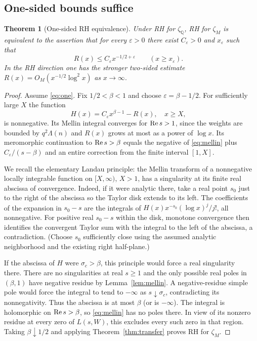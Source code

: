 \documentclass[11pt]{article}
\newtheorem{theorem}{Theorem}[section]
\theoremstyle{remark}\newtheorem{remark}[theorem]{Remark}
\newcommand{\Q}{\mathbb Q}\newcommand{\C}{\mathbb C}\newcommand{\F}{\mathbb F}\newcommand{\one}{\mathbf 1}\newcommand{\St}{\mathrm{St}}\newcommand{\Gg}{\Gamma}\newcommand{\PT}{\mathcal P}\newcommand{\eps}{\varepsilon}
\begin{document}
\subsection{One-sided bounds suffice}
\begin{theorem}[One-sided RH equivalence]\label{thm:onesided}
Under RH for $\zeta_\Q$, RH for $\zeta_M$ is equivalent to the assertion that for every $\eps>0$ there exist $C_\eps>0$ and $x_\eps$ such that
\begin{equation}\label{eq:one}
 R(x)\le C_\eps x^{-1/2+\eps}\qquad(x\ge x_\eps).
\end{equation}
In the RH direction one has the stronger two-sided estimate $R(x)=O_M(x^{-1/2}\log^2 x)$ as $x\to\infty$.
\end{theorem}
\begin{proof}
Assume \eqref{eq:one}. Fix $1/2<\beta<1$ and choose $\eps=\beta-1/2$. For sufficiently large $X$ the function
\[
 H(x)=C_\eps x^{\beta-1}-R(x),\quad x\ge X,
\]
is nonnegative. Its Mellin integral converges for $\operatorname{Re} s>1$, since the weights are bounded by $q^2\Lambda(n)$ and $R(x)$ grows at most as a power of $\log x$. Its meromorphic continuation to $\operatorname{Re} s>\beta$ equals the negative of \eqref{eq:mellin} plus $C_\eps/(s-\beta)$ and an entire correction from the finite interval $[1,X]$.

We recall the elementary Landau principle: the Mellin transform of a nonnegative locally integrable function on $[X,\infty)$, $X>1$, has a singularity at its finite real abscissa of convergence. Indeed, if it were analytic there, take a real point $s_0$ just to the right of the abscissa so the Taylor disk extends to its left. The coefficients of the expansion in $s_0-s$ are the integrals of $H(x)x^{-s_0}(\log x)^j/j!$, all nonnegative. For positive real $s_0-s$ within the disk, monotone convergence then identifies the convergent Taylor sum with the integral to the left of the abscissa, a contradiction. (Choose $s_0$ sufficiently close using the assumed analytic neighborhood and the existing right half-plane.)

If the abscissa of $H$ were $\sigma_c>\beta$, this principle would force a real singularity there. There are no singularities at real $s\ge1$ and the only possible real poles in $(\beta,1)$ have negative residue by Lemma~\ref{lem:mellin}. A negative-residue simple pole would force the integral to tend to $-\infty$ as $s\downarrow\sigma_c$, contradicting its nonnegativity. Thus the abscissa is at most $\beta$ (or is $-\infty$). The integral is holomorphic on $\operatorname{Re} s>\beta$, so \eqref{eq:mellin} has no poles there. In view of its nonzero residue at every zero of $L(s,W)$, this excludes every such zero in that region. Taking $\beta\downarrow1/2$ and applying Theorem~\ref{thm:transfer} proves RH for $\zeta_M$.


\end{proof}
\end{document}
